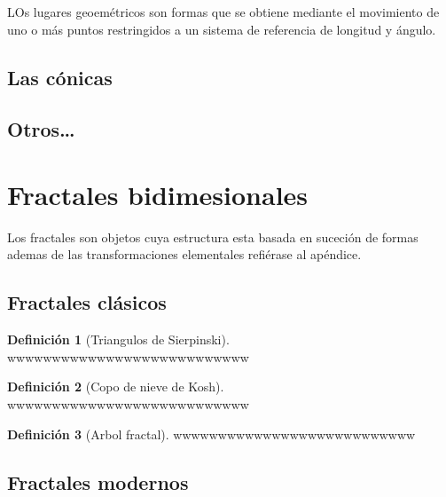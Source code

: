 \documentclass[16pt,]{krantz}
\theoremstyle{definition}
\newtheorem{definition}{Definición}[chapter]
\theoremstyle{definition}
\theoremstyle{definition}
\theoremstyle{definition}
\theoremstyle{remark}
\begin{document}
LOs lugares geoemétricos son formas que se obtiene mediante el movimiento de uno o más puntos restringidos a un sistema de referencia de longitud y ángulo.

\hypertarget{las-cuxf3nicas}{%
\subsection{Las cónicas}\label{las-cuxf3nicas}}

\hypertarget{otros}{%
\subsection{Otros\ldots{}}\label{otros}}

\hypertarget{fractales-bidimesionales}{%
\section{Fractales bidimesionales}\label{fractales-bidimesionales}}

Los fractales son objetos cuya estructura esta basada en suceción de formas ademas de las transformaciones elementales refiérase al apéndice.

\hypertarget{fractales-cluxe1sicos}{%
\subsection{Fractales clásicos}\label{fractales-cluxe1sicos}}

\begin{definition}[Triangulos de Sierpinski]
\protect\hypertarget{def:sierpinski}{}{\label{def:sierpinski} {} }wwwwwwwwwwwwwwwwwwwwwwwwwww
\end{definition}

\begin{definition}[Copo de nieve de Kosh]
\protect\hypertarget{def:kosh}{}{\label{def:kosh} {} }wwwwwwwwwwwwwwwwwwwwwwwwwww
\end{definition}

\begin{definition}[Arbol fractal]
\protect\hypertarget{def:arbol}{}{\label{def:arbol} {} }wwwwwwwwwwwwwwwwwwwwwwwwwww
\end{definition}

\hypertarget{fractales-modernos}{%
\subsection{Fractales modernos}\label{fractales-modernos}}
\end{document}
